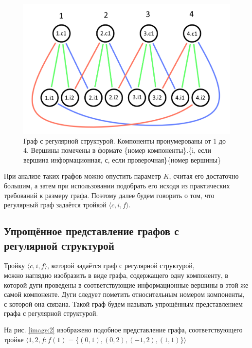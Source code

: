\documentclass[14pt]{mmcs-article}
\begin{document}
\begin{figure}[H]
  \centering
  \includegraphics[scale=0.4]{Fig_1.png}
  \caption{ Граф с регулярной структурой. Компоненты пронумерованы от 1 до 4. Вершины помечены в формате \{номер компоненты\}.\{i, если вершина информационная, с, если проверочная\}\{номер вершины\} }\label{image:1}
\end{figure}

При анализе таких графов можно опустить параметр $K$, считая его достаточно большим, а затем при использовании подобрать его исходя из практических требований к размеру графа. Поэтому далее будем говорить о том, что регулярный граф задаётся тройкой $\langle c, i, f \rangle$.

\subsection{Упрощённое представление графов с\\ регулярной структурой}

Тройку $\langle c, i, f \rangle$, которой задаётся граф с регулярной структурой,\\ можно наглядно изобразить в виде графа, содержащего одну компоненту, в которой дуги проведены в соответствующие информационные вершины в этой же самой компоненте. Дуги следует пометить относительным номером компоненты, с которой она связана. Такой граф будем называть упрощённым представлением графа с регулярной структурой.

На рис. \ref{image:2} изображено подобное представление графа, соответствующего тройке $\langle 1, 2, f: f(1) = \{ (0, 1), (0, 2), (-1, 2), (1, 1) \} \rangle$
\end{document}
